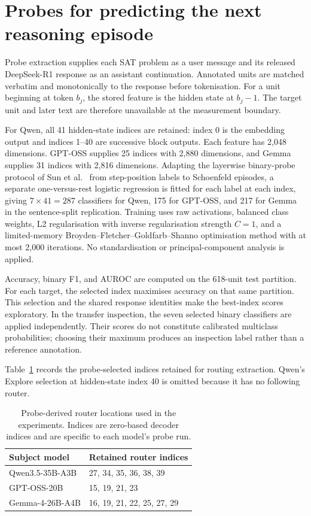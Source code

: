 \documentclass[12pt,a4paper,twoside,openright]{book}
\begin{document}
\section{Probes for predicting the next reasoning episode}
\label{sec:setup-probes}

Probe extraction supplies each SAT problem as a user message and its released
DeepSeek-R1 response as an assistant continuation. Annotated units are
matched verbatim and monotonically to the response before tokenisation.
For a unit beginning at token $b_j$, the stored feature is the hidden state
at $b_j-1$. The target unit and later text are therefore unavailable at the
measurement boundary.

For Qwen, all 41 hidden-state indices are retained: index 0 is the embedding
output and indices 1--40 are successive block outputs. Each feature has 2,048
dimensions. GPT-OSS supplies 25 indices with 2,880 dimensions, and Gemma
supplies 31 indices with 2,816 dimensions. Adapting the layerwise binary-probe protocol of
Sun et al.~\cite{sun2026trajectories} from step-position labels to Schoenfeld
episodes, a separate one-versus-rest logistic regression is fitted for each
label at each index, giving $7\times41=287$ classifiers for Qwen,
175 for GPT-OSS, and 217 for Gemma in the sentence-split replication.
Training uses raw activations, balanced class weights, L2
regularisation with inverse regularisation strength $C=1$, and a
limited-memory Broyden--Fletcher--Goldfarb--Shanno optimisation method with
at most 2,000 iterations. No standardisation or principal-component analysis is applied.

Accuracy, binary F1, and AUROC are computed on the 618-unit test partition.
For each target, the selected index maximises accuracy on that same
partition. This selection and the shared response identities make the
best-index scores exploratory. In the transfer inspection, the seven
selected binary classifiers are applied independently. Their scores do not
constitute calibrated multiclass probabilities; choosing their maximum
produces an inspection label rather than a reference annotation.

Table~\ref{tab:method-layers} records the probe-selected indices retained for
routing extraction. Qwen's Explore selection at hidden-state index 40 is
omitted because it has no following router.

\begin{table}[!ht]
  \centering
  \small
  \caption{Probe-derived router locations used in the experiments. Indices
  are zero-based decoder indices and are specific to each model's probe run.}
  \label{tab:method-layers}
  \begin{tabular}{@{}ll@{}}
    \toprule
    Subject model & Retained router indices \\
    \midrule
    Qwen3.5-35B-A3B & 27, 34, 35, 36, 38, 39 \\
    GPT-OSS-20B & 15, 19, 21, 23 \\
    Gemma-4-26B-A4B & 16, 19, 21, 22, 25, 27, 29 \\
    \bottomrule
  \end{tabular}
\end{table}
\end{document}
